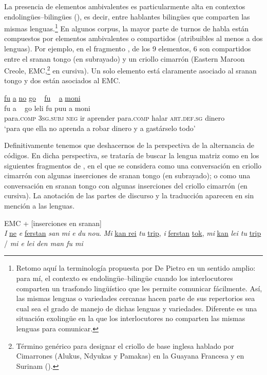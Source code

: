 \documentclass[output=paper]{langscibook}
\begin{document}
La presencia de elementos ambivalentes es particularmente alta en contextos endolingües--bilingües (\citealt{DePietro1988}), es decir,  entre hablantes bilingües que comparten las mismas lenguas.\footnote{Retomo aquí la terminología propuesta por De Pietro en un sentido amplio: para mí, el contexto es endolingüe--bilingüe cuando los interlocutores comparten un trasfondo lingüístico que les permite comunicar fácilmente. Así, las mismas lenguas o variedades cercanas hacen parte de sus repertorios sea cual sea el grado de manejo de dichas lenguas y variedades. Diferente es una situación exolingüe en la que los interlocutores no comparten las mismas lenguas para comunicar.} En algunos corpus, la mayor parte de turnos de habla están compuestos por elementos ambivalentes o compartidos (atribuibles al menos a dos lenguas). Por ejemplo, en el fragmento , de los 9 elementos, 6 son compartidos entre el sranan tongo (en subrayado) y un criollo cimarrón (Eastern Maroon Creole, EMC,\footnote{Término genérico para designar el criollo de base inglesa hablado por Cimarrones (Alukus, Ndyukas y Pamakas) en la Guayana Francesa y en Surinam (\citealt{MiggeLéglise2013}).} en cursiva). Un solo elemento está claramente asociado al sranan tongo y dos están asociados al EMC.

\let\eachwordtwo=\itshape
\ea\label{ex:leglise:3}
\glll \uline{fu}   \uline{a} \uline{no}  \uline{go}  ~    \uline{fu} ~  \uline{a} \uline{moni}\\
      fu           a         ~           go       leli   fu        puu a         moni\\
para.\textsc{comp} 3\textsc{sg.subj} \textsc{neg}   ir aprender para.\textsc{comp} halar \textsc{art.def.sg} dinero\\
\glt `para que ella no aprenda a robar dinero y a gastárselo todo'
\z
\let\eachwordtwo=\upshape

Definitivamente tenemos que deshacernos de la perspectiva de la alternancia de códigos. En dicha perspectiva, se trataría de buscar la lengua matriz como en los siguientes fragmentos de \citet[capítulo 8]{MiggeLéglise2013}, en el que se considera  como una conversación en criollo cimarrón con algunas inserciones de sranan tongo (en subrayado); o  como una conversación en sranan tongo con algunas inserciones del criollo cimarrón (en cursiva). La anotación de las partes de discurso y la traducción aparecen en  sin mención a las lenguas.

\ea\label{ex:leglise:4}
{ EMC + [inserciones en sranan]}\\
\textit{I} \uline{ne} \textit{e} \uline{ferstan} \textit{san}  \textit{mi} \textit{e} \textit{du} \textit{nou}. \textit{Mi} \uline{kan rei} \textit{tu} \uline{trip}, \textit{i} \uline{ferstan} \uline{tok}, \textit{mi} \uline{kan} \textit{lei tu} \uline{trip} / \textit{mi e lei den man fu mi} \\
\z
\end{document}
